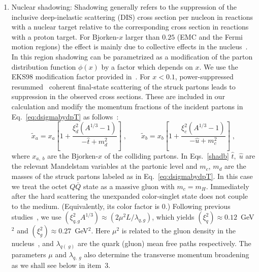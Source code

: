 \documentclass[article,showpacs,preprintnumbers,amsmath,amssymb]{revtex4}
\newcommand{\barQ}{{\bar{Q}}}
\begin{document}
\begin{enumerate}
\item{Nuclear shadowing: Shadowing generally refers to the suppression  of the
inclusive deep-inelastic scattering (DIS) cross section per nucleon   in
reactions with  a nuclear target  relative to the corresponding cross section
in reactions with a proton target. For Bjorken-$x$ larger than $0.25$
(EMC and the Fermi motion regions) the effect is mainly due to collective effects in the
nucleus~\cite{Norton:2003}. In this region shadowing can be parametrized as a
modification of the parton distribution function $\phi(x)$ by a factor which
depends on $x$. We use the EKS98 modification factor provided
in~\cite{eks1:98}. For $x<0.1$,  power-suppressed
resummed~\cite{Qiu:2003vd,Qiu:2004da} coherent final-state scattering of the
struck partons leads to suppression in the observed cross sections. These are
included in our calculation and modify  the momentum fractions of the incident
partons in Eq.~\ref{eq:dsigmabydpT} as follows~\cite{Vitev:2006bi}:
\begin{equation}
   \tilde{x}_{a} =
   x_a\left[1+\frac{\xi_d^2(A^{1/3}-1)}{-\hat{t}+m_d^2}\right]\;,\qquad
  \tilde{x}_{b} = 
   x_b\left[1+\frac{\xi_c^2(A^{1/3}-1)}{-\hat{u}+m_c^2}\right]\; , 
\label{shadb}
\end{equation}
where $x_{a,\;b}$ are the Bjorken-$x$ of the colliding partons.  In
Eqs.~\ref{shadb}  $\hat{t}, \; \hat{u}$ are the relevant Mandelstam variables
at the partonic level and $m_c$, $m_d$ are the masses of the struck partons
labeled as in Eq.~\ref{eq:dsigmabydpT}. In this case we treat the octet $Q\barQ$
state as a massive gluon  with $m_c=m_H$. Immediately after the hard scattering
the unexpanded color-singlet state does not couple to the medium.
(Equivalently, its color factor is 0.) Following previous
studies~\cite{Sharma:2009hn}, we use $ (\xi_{q,g}^2 A^{1/3}) \approx ( 2 \mu^2
L/ \lambda_{q,g} )$, which yields $(\xi_q^2) \approx 0.12$~GeV$^2$ and
$(\xi_g^2) \approx 0.27$~GeV$^2$. Here $\mu^2$ is related to the gluon density
in the nucleus~\cite{Vitev:2006bi}, and $\lambda_{q(\;g)}$ are the quark
(gluon) mean free paths respectively. The parameters $\mu$ and
$\lambda_{q,\;g}$ also determine the transverse momentum broadening as we shall
see below in item~3.}



\end{enumerate}
\end{document}

